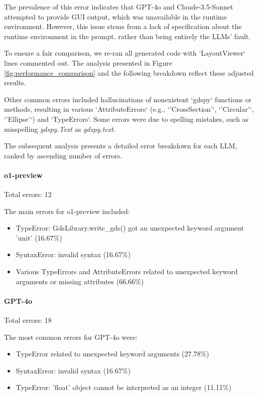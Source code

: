 \documentclass{article}
\begin{document}
The prevalence of this error indicates that GPT-4o and Claude-3.5-Sonnet attempted to provide GUI output, which was unavailable in the runtime environment. However, this issue stems from a lack of specification about the runtime environment in the prompt, rather than being entirely the LLMs' fault.

To ensure a fair comparison, we re-ran all generated code with `LayoutViewer` lines commented out. The analysis presented in Figure \ref{fig:performance_comparison} and the following breakdown reflect these adjusted results.

Other common errors included hallucinations of nonexistent `gdspy` functions or methods, resulting in various `AttributeErrors` (e.g., `'CrossSection'`, `'Circular'`, `'Ellipse'`) and `TypeErrors`. Some errors were due to spelling mistakes, such as misspelling \textit{gdspy.Text} as \textit{gdspy.text}.

The subsequent analysis presents a detailed error breakdown for each LLM, ranked by ascending number of errors.

\paragraph{o1-preview}
Total errors: 12

The main errors for o1-preview included:
\begin{itemize}
    \item TypeError: GdsLibrary.write\_gds() got an unexpected keyword argument 'unit' (16.67\%)
    \item SyntaxError: invalid syntax (16.67\%)
    \item Various TypeErrors and AttributeErrors related to unexpected keyword arguments or missing attributes (66.66\%)
\end{itemize}

\paragraph{GPT-4o}
Total errors: 18

The most common errors for GPT-4o were:
\begin{itemize}
    \item TypeError related to unexpected keyword arguments (27.78\%)
    \item SyntaxError: invalid syntax (16.67\%)
    \item TypeError: 'float' object cannot be interpreted as an integer (11.11\%)
\end{itemize}
\end{document}
